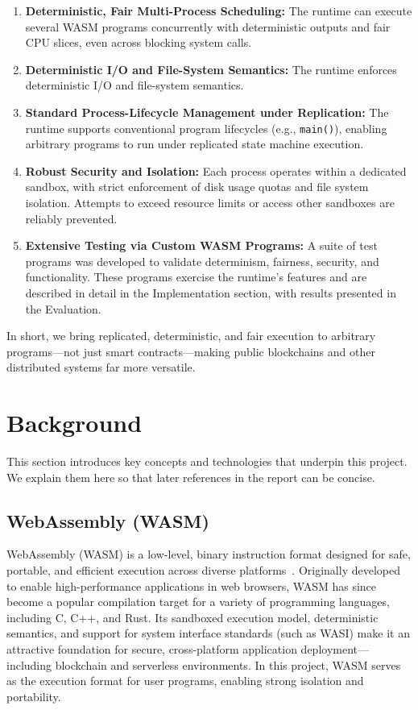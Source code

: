 \documentclass[10pt,a4paper,twocolumn]{IEEEtran}
\begin{document}
\begin{enumerate}
    \item \textbf{Deterministic, Fair Multi-Process Scheduling:} The runtime can execute several WASM programs concurrently with deterministic outputs and fair CPU slices, even across blocking system calls.
    \item \textbf{Deterministic I/O and File-System Semantics:} The runtime enforces deterministic I/O and file-system semantics.
    \item \textbf{Standard Process-Lifecycle Management under Replication:} The runtime supports conventional program lifecycles (e.g., \texttt{main()}), enabling arbitrary programs to run under replicated state machine execution.
    \item \textbf{Robust Security and Isolation:} Each process operates within a dedicated sandbox, with strict enforcement of disk usage quotas and file system isolation. Attempts to exceed resource limits or access other sandboxes are reliably prevented.
    \item \textbf{Extensive Testing via Custom WASM Programs:} A suite of test programs was developed to validate determinism, fairness, security, and functionality. These programs exercise the runtime's features and are described in detail in the Implementation section, with results presented in the Evaluation.
\end{enumerate}

In short, we bring replicated, deterministic, and fair execution to arbitrary programs—not just smart contracts—making public blockchains and other distributed systems far more versatile.

\section{Background}\label{sec:background}

This section introduces key concepts and technologies that underpin this project. We explain them here so that later references in the report can be concise.

\subsection{WebAssembly (WASM)}
WebAssembly (WASM) is a low-level, binary instruction format designed for safe, portable, and efficient execution across diverse platforms~\cite{wasm_w3c,wasm_sok,wasm_formal}. Originally developed to enable high-performance applications in web browsers, WASM has since become a popular compilation target for a variety of programming languages, including C, C++, and Rust. Its sandboxed execution model, deterministic semantics, and support for system interface standards (such as WASI) make it an attractive foundation for secure, cross-platform application deployment---including blockchain and serverless environments. In this project, WASM serves as the execution format for user programs, enabling strong isolation and portability.
\end{document}
